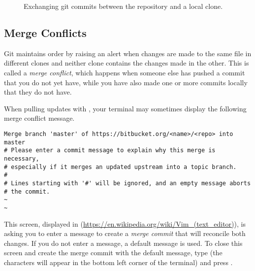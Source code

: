 \begin{figure}[H]
\centering
{}
\caption{Exchanging git commits between the repository and a local clone.}
\end{figure}

\subsection*{Merge Conflicts} %
Git maintains order by raising an alert when changes are made to the same file in different clones and neither clone contains the changes made in the other.
This is called a \emph{merge conflict}, which happens when someone else  has pushed a commit that you do not yet have, while you have also made one or more commits locally that they do not have.

\begin{warn}
When pulling updates with , your terminal may sometimes display the following merge conflict message.
\begin{lstlisting}
Merge branch 'master' of https://bitbucket.org/<name>/<repo> into master
# Please enter a commit message to explain why this merge is necessary,
# especially if it merges an updated upstream into a topic branch.
#
# Lines starting with '#' will be ignored, and an empty message aborts
# the commit.
~
~
\end{lstlisting}

This screen, displayed in  (\url{https://en.wikipedia.org/wiki/Vim_(text_editor)}), is asking you to enter a message to create a \emph{merge commit} that will reconcile both changes.
If you do not enter a message, a default message is used. 
To close this screen and create the merge commit with the default message, type  (the characters will appear in the bottom left corner of the terminal) and press .

\end{warn}

